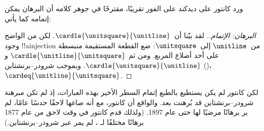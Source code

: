 \documentclass[../../../include/open-logic-section]{subfiles}
\begin{document}
ورد كانتور على ديدكند على الفور تقريبًا، مقترحًا في جوهر كلامه أن
البرهان يمكن إتمامه كما يأتي:

\begin{proof}[البرهان: الإتمام.]
لقد بيّنا أن~$\cardle{\unitsquare}{\unitline}$. لكن من الواضح وجود
!!a{injection} من~$\unitline$ إلى~$\unitsquare$: ضع القطعة المستقيمة
منبسطة على أحد أضلاع المربع. ومن ثم
$\cardle{\unitline}{\unitsquare}$ و
$\cardle{\unitsquare}{\unitline}$. وبموجب شرودر--برنشتاين
()،
$\cardeq{\unitline}{\unitsquare}$.
\end{proof}

لكن كانتور لم يكن يستطيع بالطبع إتمام السطر الأخير بهذه العبارات، إذ
لم تكن مبرهنة شرودر--برنشتاين قد بُرهنت بعد. والواقع أن كانتور، مع أنه
صاغها لاحقًا حدسًا عامًا، لم ير برهانًا مرضيًا لها حتى عام 1897.
(ولذلك قدم كانتور في وقت لاحق من عام 1877 برهانًا مختلفًا لـ
، لم يمر عبر شرودر--برنشتاين.)
\end{document}
